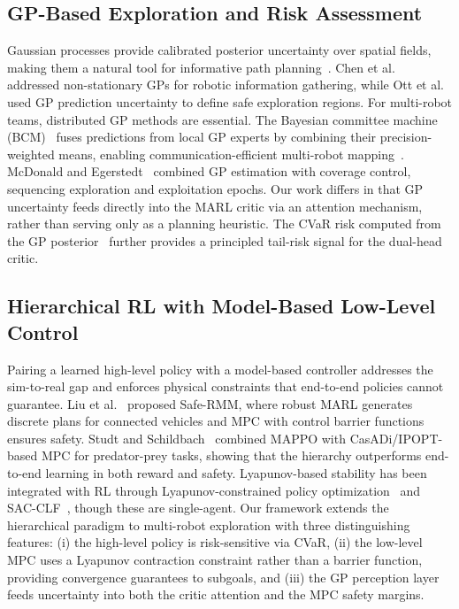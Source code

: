 \documentclass[letterpaper]{IEEEtran}
\begin{document}
\subsection{GP-Based Exploration and Risk Assessment}

Gaussian processes provide calibrated posterior uncertainty over spatial fields, making them a natural tool for informative path planning~\cite{marchant2014bayesian}. Chen et al.~\cite{chen2024adaptive} addressed non-stationary GPs for robotic information gathering, while Ott et al.~\cite{ott2024safe} used GP prediction uncertainty to define safe exploration regions. For multi-robot teams, distributed GP methods are essential. The Bayesian committee machine (BCM)~\cite{tresp2000bcm} fuses predictions from local GP experts by combining their precision-weighted means, enabling communication-efficient multi-robot mapping~\cite{cao2025multirobot}. McDonald and Egerstedt~\cite{mcdonald2021multirobot} combined GP estimation with coverage control, sequencing exploration and exploitation epochs. Our work differs in that GP uncertainty feeds directly into the MARL critic via an attention mechanism, rather than serving only as a planning heuristic. The CVaR risk computed from the GP posterior~\cite{dhakal2025gpcvar} further provides a principled tail-risk signal for the dual-head critic.

\subsection{Hierarchical RL with Model-Based Low-Level Control}

Pairing a learned high-level policy with a model-based controller addresses the sim-to-real gap and enforces physical constraints that end-to-end policies cannot guarantee. Liu et al.~\cite{liu2024safermm} proposed Safe-RMM, where robust MARL generates discrete plans for connected vehicles and MPC with control barrier functions ensures safety. Studt and Schildbach~\cite{studt2025hierarchical} combined MAPPO with CasADi/IPOPT-based MPC for predator-prey tasks, showing that the hierarchy outperforms end-to-end learning in both reward and safety. Lyapunov-based stability has been integrated with RL through Lyapunov-constrained policy optimization~\cite{chow2018lyapunov} and SAC-CLF~\cite{chen2025sacclf}, though these are single-agent. Our framework extends the hierarchical paradigm to multi-robot exploration with three distinguishing features: (i) the high-level policy is risk-sensitive via CVaR, (ii) the low-level MPC uses a Lyapunov contraction constraint rather than a barrier function, providing convergence guarantees to subgoals, and (iii) the GP perception layer feeds uncertainty into both the critic attention and the MPC safety margins.
\end{document}
